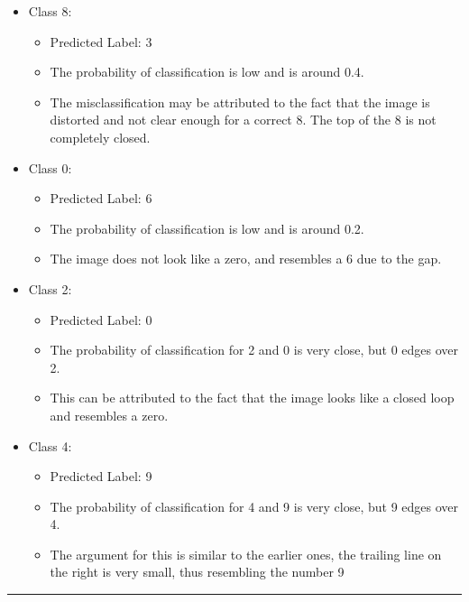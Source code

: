 \documentclass[11pt]{article}
\providecommand{\tightlist}{%
      \setlength{\itemsep}{0pt}\setlength{\parskip}{0pt}}
\begin{document}
\begin{itemize}
\tightlist
\item
  Class 8:

  \begin{itemize}
  \tightlist
  \item
    Predicted Label: 3
  \item
    The probability of classification is low and is around 0.4.
  \item
    The misclassification may be attributed to the fact that the image
    is distorted and not clear enough for a correct 8. The top of the 8
    is not completely closed.
  \end{itemize}
\item
  Class 0:

  \begin{itemize}
  \tightlist
  \item
    Predicted Label: 6
  \item
    The probability of classification is low and is around 0.2.
  \item
    The image does not look like a zero, and resembles a 6 due to the
    gap.
  \end{itemize}
\item
  Class 2:

  \begin{itemize}
  \tightlist
  \item
    Predicted Label: 0
  \item
    The probability of classification for 2 and 0 is very close, but 0
    edges over 2.
  \item
    This can be attributed to the fact that the image looks like a
    closed loop and resembles a zero.
  \end{itemize}
\item
  Class 4:

  \begin{itemize}
  \tightlist
  \item
    Predicted Label: 9
  \item
    The probability of classification for 4 and 9 is very close, but 9
    edges over 4.
  \item
    The argument for this is similar to the earlier ones, the trailing
    line on the right is very small, thus resembling the number 9
  \end{itemize}
\end{itemize}

    \begin{center}\rule{0.5\linewidth}{\linethickness}\end{center}
\end{document}
